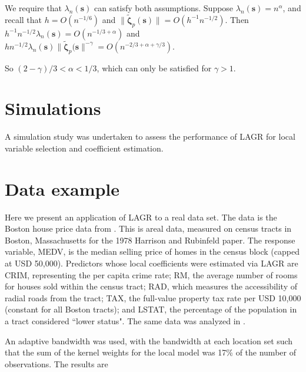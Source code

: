 \documentclass[authoryear, review, 11pt]{elsarticle}
\begin{document}
        We require that $\lambda_n(\bm{s})$ can satisfy both assumptions. Suppose $\lambda_n(\bm{s}) = n^{\alpha}$, and recall that $h = O(n^{-1/6})$ and $ \| \tilde{\bm{\zeta}}_p(\bm{s}) \| = O(h^{-1} n^{-1/2})$. Then $h^{-1} n^{-1/2} \lambda_n(\bm{s}) = O(n^{-1/3 + \alpha})$ and $h n^{-1/2} \lambda_n(\bm{s})  \| \tilde{\bm{\zeta}}_p(\bm{s} \|^{-\gamma} = O(n^{-2/3 + \alpha + \gamma/3})$.
        
        So $ (2 - \gamma)/3 < \alpha < 1/3 $, which can only be satisfied for $\gamma > 1$.

    \section{Simulations}
        A simulation study was undertaken to assess the performance of LAGR for local variable selection and coefficient estimation. 


    \section{Data example}
        Here we present an application of LAGR to a real data set. The data is the Boston house price data from \cite{Harrison-Rubinfeld-1978; Gilley-Pace-1996; Pace-Gilley-1997}. This is areal data, measured on census tracts in Boston, Massachusetts for the 1978 Harrison and Rubinfeld paper. The response variable, MEDV, is the median selling price of homes in the census block (capped at USD 50,000). Predictors whose local coefficients were estimated via LAGR are CRIM, representing the per capita crime rate; RM, the average number of rooms for houses sold within the census tract; RAD, which measures the accessibility of radial roads from the tract; TAX, the full-value property tax rate per USD 10,000 (constant for all Boston tracts); and LSTAT, the percentage of the population in a tract considered ``lower status". The same data was analyzed in \cite{Sun-Yan-Zhang-Lu-2014}.

        An adaptive bandwidth was used, with the bandwidth at each location set such that the sum of the kernel weights for the local model was 17\% of the number of observations. The results are 

        


\appendix
\end{document}
